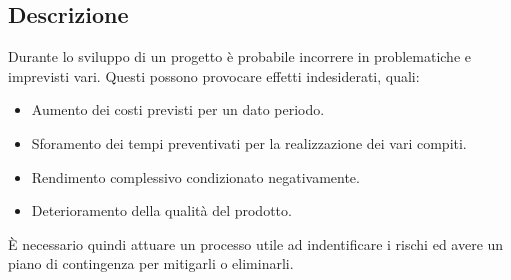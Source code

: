 \subsection{Descrizione}
    Durante lo sviluppo di un progetto è probabile incorrere in problematiche e imprevisti vari. Questi possono provocare effetti indesiderati, quali:
    \begin{itemize}
        \item Aumento dei costi previsti per un dato periodo. 
        \item Sforamento dei tempi preventivati per la realizzazione dei vari compiti. 
        \item Rendimento complessivo condizionato negativamente. 
        \item Deterioramento della qualità del prodotto. 
    \end{itemize}

    È necessario quindi attuare un processo utile ad indentificare i rischi ed avere un piano di contingenza per mitigarli o eliminarli. 